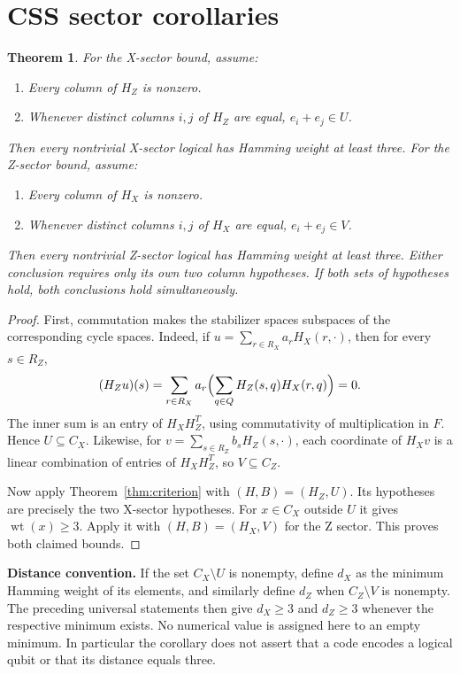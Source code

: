 \documentclass{article}
\newtheorem{theorem}{Theorem}
\DeclareMathOperator{\wt}{wt}
\begin{document}
\section{CSS sector corollaries}\label{sec:css}

\begin{theorem}\label{thm:css}
For the X-sector bound, assume:
\begin{enumerate}
  \item Every column of \(H_Z\) is nonzero.
  \item Whenever distinct columns \(i, j\) of \(H_Z\) are equal, \(e_i + e_j \in U\).
\end{enumerate}
Then every nontrivial X-sector logical has Hamming weight at least three. For the Z-sector
bound, assume:
\begin{enumerate}
  \item Every column of \(H_X\) is nonzero.
  \item Whenever distinct columns \(i, j\) of \(H_X\) are equal, \(e_i + e_j \in V\).
\end{enumerate}
Then every nontrivial Z-sector logical has Hamming weight at least three. Either
conclusion requires only its own two column hypotheses. If both sets of hypotheses hold,
both conclusions hold simultaneously.
\end{theorem}

\begin{proof}
  First, commutation makes the stabilizer spaces subspaces of the corresponding cycle
  spaces. Indeed, if \(u = \sum_{r \in R_X} a_r H_X(r, \cdot)\), then for every
  \(s \in R_Z\),
  \begin{equation}
    (H_Z u)(s) = \sum_{r \in R_X} a_r
      \Bigl(\sum_{q \in Q} H_Z(s, q) H_X(r, q)\Bigr) = 0.
  \end{equation}
  The inner sum is an entry of \(H_X H_Z^T\), using commutativity of multiplication in
  \(F\). Hence \(U \subseteq C_X\). Likewise, for \(v = \sum_{s \in R_Z} b_s H_Z(s, \cdot)\),
  each coordinate of \(H_X v\) is a linear combination of entries of \(H_X H_Z^T\), so
  \(V \subseteq C_Z\).

  Now apply Theorem~\ref{thm:criterion} with \((H, B) = (H_Z, U)\). Its hypotheses are
  precisely the two X-sector hypotheses. For \(x \in C_X\) outside \(U\) it gives
  \(\wt(x) \ge 3\). Apply it with \((H, B) = (H_X, V)\) for the Z sector. This proves both
  claimed bounds.
\end{proof}

\textbf{Distance convention.} If the set \(C_X \setminus U\) is nonempty, define \(d_X\) as
the minimum Hamming weight of its elements, and similarly define \(d_Z\) when
\(C_Z \setminus V\) is nonempty. The preceding universal statements then give
\(d_X \ge 3\) and \(d_Z \ge 3\) whenever the respective minimum exists. No numerical value
is assigned here to an empty minimum. In particular the corollary does not assert that a
code encodes a logical qubit or that its distance equals three.
\end{document}
